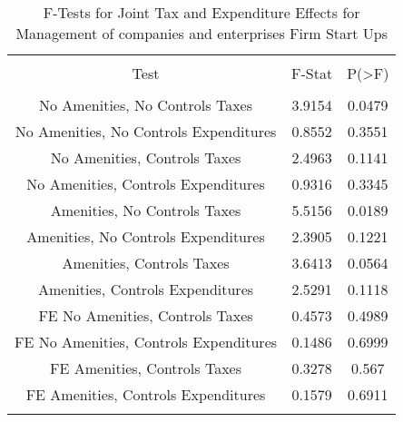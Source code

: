 
\begin{table}[!htbp] \centering 
  \caption{F-Tests for Joint Tax and Expenditure Effects for Management of companies and enterprises Firm Start Ups} 
  \label{55Ftests} 
\begin{tabular}{@{\extracolsep{5pt}} ccc} 
\\[-1.8ex]\hline 
\hline \\[-1.8ex] 
Test & F-Stat & P(\textgreater F) \\ 
\hline \\[-1.8ex] 
No Amenities, No Controls Taxes & 3.9154 & 0.0479 \\ 
No Amenities, No Controls Expenditures & 0.8552 & 0.3551 \\ 
No Amenities, Controls Taxes & 2.4963 & 0.1141 \\ 
No Amenities, Controls Expenditures & 0.9316 & 0.3345 \\ 
Amenities, No Controls Taxes & 5.5156 & 0.0189 \\ 
Amenities, No Controls Expenditures & 2.3905 & 0.1221 \\ 
Amenities, Controls Taxes & 3.6413 & 0.0564 \\ 
Amenities, Controls Expenditures & 2.5291 & 0.1118 \\ 
FE No Amenities, Controls Taxes & 0.4573 & 0.4989 \\ 
FE No Amenities, Controls Expenditures & 0.1486 & 0.6999 \\ 
FE Amenities, Controls Taxes & 0.3278 & 0.567 \\ 
FE Amenities, Controls Expenditures & 0.1579 & 0.6911 \\ 
\hline \\[-1.8ex] 
\end{tabular} 
\end{table} 
